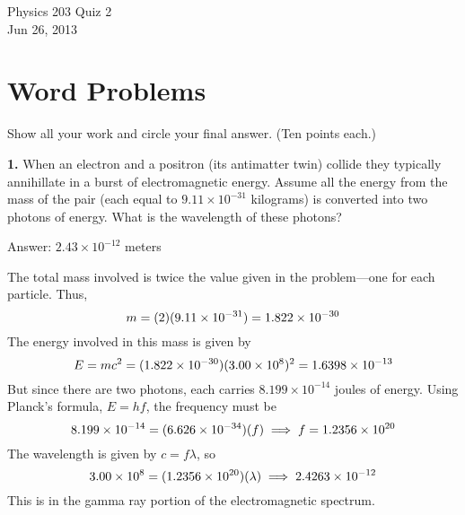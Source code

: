 \documentclass{article}
\begin{document}
\setcounter{page}{1}


\begin{center}
\LARGE{Physics 203 Quiz 2} \\[2mm]
\small{\sf Jun 26, 2013}
\end{center}

\thispagestyle{empty}

\section*{Word Problems}
Show all your work and circle your final answer. (Ten points each.) \par


\textbf{1.} \quad When an electron and a positron (its antimatter twin) collide they
typically annihillate in a burst of electromagnetic energy. Assume all
the energy from the mass of the pair (each equal to \(9.11 \times 10^{-31}\)
kilograms) is converted into two photons of energy. What is the
wavelength of these photons?
\par {\footnotesize\sf Answer: \(2.43 \times 10^{-12}\) meters}
\par The total mass involved is twice the value given in the problem---one
for each particle. Thus,
%
\begin{equation*}
m = (2)(9.11 \times 10^{-31})
= 1.822 \times 10^{-30}
\end{equation*}
The energy involved in this mass is given by
%
\begin{equation*}
E = mc^2
= (1.822 \times 10^{-30})(3.00 \times 10^{8})^2
= 1.6398 \times 10^{-13}
\end{equation*}
But since there are two photons, each carries \(8.199 \times 10^{-14}\) joules
of energy. Using Planck's formula, $E = hf$, the frequency must be
%
\begin{equation*}
8.199 \times 10^{-14} = (6.626 \times 10^{-34})(f)
\implies f = 1.2356 \times 10^{20}
\end{equation*}
The wavelength is given by $c = f\lambda$, so
%
\begin{equation*}
3.00 \times 10^{8} = (1.2356 \times 10^{20})(\lambda)
\implies 2.4263 \times 10^{-12}
\end{equation*}
This is in the gamma ray portion of the electromagnetic spectrum.
\newpage
\end{document}
